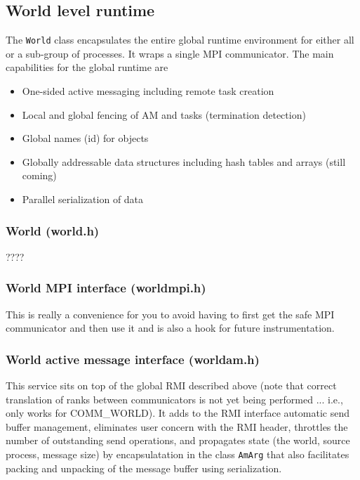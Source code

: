 \documentclass[letterpaper]{article}
\newcommand\liststyleLvi{%
\renewcommand\labelitemi{${\bullet}$}
\renewcommand\labelitemii{${\circ}$}
\renewcommand\labelitemiii{${\blacksquare}$}
\renewcommand\labelitemiv{${\bullet}$}
}
\begin{document}
\bigskip

\subsection{World level runtime}
The \texttt{World} class encapsulates the entire global runtime environment for either all or a sub-group of processes.
It wraps a single MPI communicator. The main capabilities for the global runtime are

\liststyleLvi
\begin{itemize}
\item One-sided active messaging including remote task creation
\item Local and global fencing of AM and tasks (termination detection)
\item Global names (id) for objects
\item Globally addressable data structures including hash tables and arrays (still coming)
\item Parallel serialization of data 
\end{itemize}

\bigskip

\subsubsection{World (world.h)}
????

\subsubsection{World MPI interface (worldmpi.h)}
This is really a convenience for you to avoid having to first get the safe MPI communicator and then use it and is also
a hook for future instrumentation.

\subsubsection[World active message interface (worldam.h)]{World active message interface (worldam.h)}
This service sits on top of the global RMI described above (note that correct translation of ranks between communicators
is not yet being performed ... i.e., only works for COMM\_WORLD). It adds to the RMI interface automatic send buffer
management, eliminates user concern with the RMI header, throttles the number of outstanding send operations, and
propagates state (the world, source process, message size) by encapsulatation in the class \texttt{AmArg} that also
facilitates packing and unpacking of the message buffer using serialization.
\end{document}
